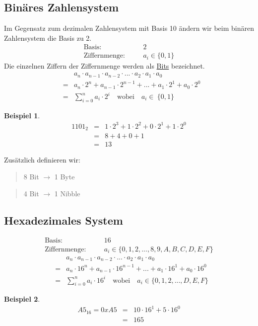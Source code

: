 \documentclass{report}
\newtheorem{myexample}{Beispiel}
\begin{document}
\subsection{Binäres Zahlensystem}
Im Gegensatz zum dezimalen Zahlensystem mit Basis 10 ändern wir beim binären Zahlensystem die Basis zu 2.
\begin{eqnarray}\mbox{Basis}:&\quad& 2 \nonumber \\
\mbox{Ziffernmenge}:&\quad&a_i \in \{0, 1\}\end{eqnarray}
Die einzelnen Ziffern der Ziffernmenge werden als \underline{Bits} bezeichnet.
\begin{eqnarray}&&a_n \cdot a_{n-1} \cdot a_{n-2} \cdot ... \cdot a_2 \cdot a_1 \cdot a_0 \nonumber \\
&=&a_n \cdot 2^n + a_{n-1} \cdot 2^{n-1} + ... + a_1 \cdot 2^1 + a_0 \cdot 2^0 \nonumber \\
&=&\sum_{i=0}^{n} a_i \cdot 2^i \quad \mbox{wobei}\quad a_i \in\ \{0, 1\}\end{eqnarray}
\begin{myexample}
\begin{eqnarray}1101_2&=&1 \cdot 2^3 + 1 \cdot 2^2 + 0 \cdot 2^1 + 1 \cdot 2^0 \nonumber \\
&=&8 + 4 + 0 + 1 \nonumber \\
&=&13\end{eqnarray}\end{myexample}
Zusätzlich definieren wir:
\begin{quote}8 Bit $\to$ 1 Byte\end{quote}
\begin{quote}4 Bit $\to$ 1 Nibble\end{quote}
\subsection{Hexadezimales System}
\begin{eqnarray}\mbox{Basis}:&\quad& 16 \nonumber \\
\mbox{Ziffernmenge}:&\quad&a_i \in \{0, 1, 2, ..., 8, 9, A, B, C, D, E, F\}\end{eqnarray}
\begin{eqnarray}&&a_n \cdot a_{n-1} \cdot a_{n-2} \cdot ... \cdot a_2 \cdot a_1 \cdot a_0 \nonumber \\
&=&a_n \cdot 16^n + a_{n-1} \cdot 16^{n-1} + ... + a_1 \cdot 16^1 + a_0 \cdot 16^0 \nonumber \\
&=&\sum_{i=0}^{n} a_i \cdot 16^i \quad \mbox{wobei}\quad a_i \in \{0, 1, 2, ..., D, E, F\}\end{eqnarray}
\begin{myexample}
\begin{eqnarray}A5_{16} = 0xA5&=&10 \cdot 16^1 + 5 \cdot 16^0 \nonumber \\
&=&165\end{eqnarray}\end{myexample}
\end{document}
